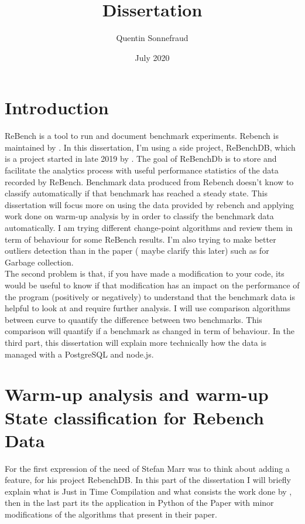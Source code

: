 \documentclass{article}
\title{Dissertation}
\author{Quentin Sonnefraud}
\date{July 2020}
\begin{document}
\maketitle

\tableofcontents

\section{Introduction}


ReBench is a tool to run and document benchmark experiments. Rebench is maintained by \cite{ReBench:2018}. In this dissertation, I'm using a side project, ReBenchDB, which is a project started in late 2019 by \cite{ReBench:2018}. The goal of ReBenchDb is to store and facilitate the analytics process with useful performance statistics of the data recorded by ReBench. Benchmark data produced from Rebench doesn't know to classify automatically if that benchmark has reached a steady state. This dissertation will focus more on using the data provided by rebench and applying work done on warm-up analysis by \cite{barrett2017virtual} in order to classify the benchmark data automatically. I am trying different change-point algorithms and review them in term of behaviour for some ReBench results. I'm also trying to make better outliers detection than in the paper ( maybe clarify this later) such as for Garbage collection.\\
The second problem is that, if you have made a modification to your code, its would be useful to know if that modification has an impact on the performance of the program (positively or negatively) to understand that the benchmark data is helpful to look at and require further analysis. I will use comparison algorithms between curve to quantify the difference between two benchmarks. This comparison will quantify if a benchmark as changed in term of behaviour. In the third part, this dissertation will explain more technically how the data is managed with a PostgreSQL and node.js.\\


\section{ Warm-up analysis and warm-up State classification for Rebench Data}

For the first expression of the need of Stefan Marr was to think about adding a feature, for his project RebenchDB. In this part of the dissertation I will briefly explain what is Just in Time Compilation and what consists the work done by \cite{barrett2017virtual}, then in the last part its the application in Python of the Paper with minor modifications of the algorithms that \cite{barrett2017virtual} present in their paper.
\end{document}
